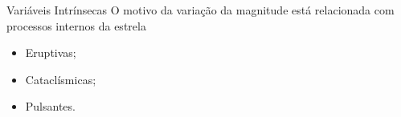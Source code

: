 \documentclass{beamer}
\begin{document}




\begin{frame}{Variáveis Intrínsecas}
O motivo da variação da magnitude está relacionada com processos internos da estrela
\begin{itemize}
    \item Eruptivas;
    \item Cataclísmicas;
    \item Pulsantes.
  \end{itemize}
\end{frame}



\end{document}
